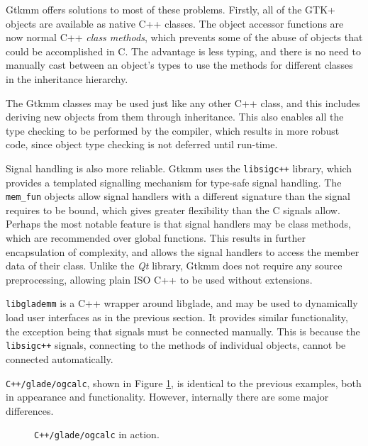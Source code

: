 \documentclass[a4paper,oneside]{article}
\newcommand{\program}[1]{\texttt{#1}}
\newcommand{\class}[1]{\texttt{#1}}
\begin{document}
Gtkmm offers solutions to most of these problems.  Firstly, all of the
GTK+ objects are available as native C++ classes.  The object accessor
functions are now normal C++ \emph{class methods}, which prevents some
of the abuse of objects that could be accomplished in C.  The
advantage is less typing, and there is no need to manually cast
between an object's types to use the methods for different classes in
the inheritance hierarchy.

The Gtkmm classes may be used just like any other C++ class, and this
includes deriving new objects from them through inheritance.  This
also enables all the type checking to be performed by the compiler,
which results in more robust code, since object type checking is not
deferred until run-time.

Signal handling is also more reliable.  Gtkmm uses the
\program{libsigc++} library, which provides a templated signalling
mechanism for type-safe signal handling.  The \class{mem\_fun} objects
allow signal handlers with a different signature than the signal
requires to be bound, which gives greater flexibility than the C
signals allow.  Perhaps the most notable feature is that signal
handlers may be class methods, which are recommended over global
functions.  This results in further encapsulation of complexity, and
allows the signal handlers to access the member data of their class.
Unlike the \emph{Qt} library, Gtkmm does not require any source
preprocessing, allowing plain ISO C++ to be used without extensions.

\program{libglademm} is a C++ wrapper around libglade, and may be used
to dynamically load user interfaces as in the previous section.  It
provides similar functionality, the exception being that signals must
be connected manually.  This is because the \program{libsigc++}
signals, connecting to the methods of individual objects, cannot be
connected automatically.

\program{C++/glade/ogcalc}, shown in Figure \ref{fig:ogcalcmm}, is
identical to the previous examples, both in appearance and
functionality.  However, internally there are some major differences.

\begin{figure}
  \centering
  \caption[\program{C++/glade/ogcalc} in action]{\program{C++/glade/ogcalc} in
    action.}
  \label{fig:ogcalcmm}
\end{figure}
\end{document}
